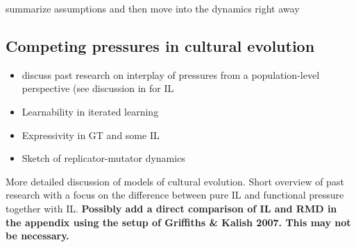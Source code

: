 \documentclass[a4paper]{article}
\newcommand{\citeposs}[2][]{\citeauthor{#2}'s (\citeyear[#1]{#2})}
\newcommand{\hl}[1]{\textcolor[rgb]{.8,.33,.0}{#1}}%
\begin{document}
\hl{summarize assumptions and then move into the dynamics right away}









\subsection{Competing pressures in cultural evolution}
\begin{itemize}
  \item \hl{discuss past research on interplay of pressures from a population-level perspective (see discussion in \citealt{kirby+etal:2015} for IL}
  \item \hl{Learnability in iterated learning}
  \item \hl{Expressivity in GT and some IL}
  \item \hl{Sketch of replicator-mutator dynamics}
\end{itemize}

\hl{More detailed discussion of models of cultural evolution. Short overview of past research with a focus on the difference between pure IL and functional pressure together with IL. {\bf Possibly add a direct comparison of IL and RMD in the appendix using the setup of Griffiths \& Kalish 2007. This may not be necessary.}}
\end{document}
